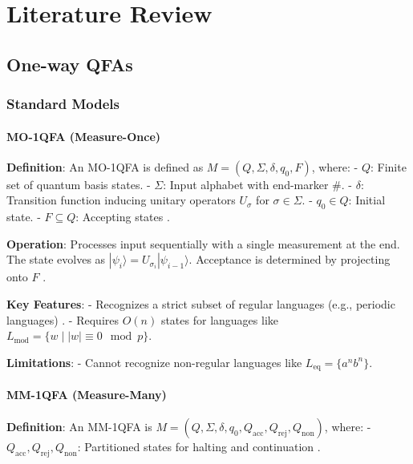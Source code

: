 \chapter{Literature Review}
\label{chap:chapter3}

\section{One-way QFAs}
\label{sec:one-way-qfas}

\subsection{Standard Models}
\label{subsec:standard-models}

\subsubsection{MO-1QFA (Measure-Once)}
\label{sssec:mo-1qfa}

\textbf{Definition}: An MO-1QFA is defined as \( M = (Q, \Sigma, \delta, q_0, F) \), where:
- \( Q \): Finite set of quantum basis states.
- \( \Sigma \): Input alphabet with end-marker \( \# \).
- \( \delta \): Transition function inducing unitary operators \( U_\sigma \) for \( \sigma \in \Sigma \).
- \( q_0 \in Q \): Initial state.
- \( F \subseteq Q \): Accepting states \cite{moore2000quantum}.

\textbf{Operation}: Processes input sequentially with a single measurement at the end. The state evolves as \( |\psi_i\rangle = U_{\sigma_i}|\psi_{i-1}\rangle \). Acceptance is determined by projecting onto \( F \) \cite{moore2000quantum}.

\textbf{Key Features}:
- Recognizes a strict subset of regular languages (e.g., periodic languages) \cite{bertoni2001regular}.
- Requires \( O(n) \) states for languages like \( L_{\text{mod}} = \{w \mid |w| \equiv 0 \mod p\} \).

\textbf{Limitations}: 
- Cannot recognize non-regular languages like \( L_{\text{eq}} = \{a^n b^n\} \).

\subsubsection{MM-1QFA (Measure-Many)}
\label{sssec:mm-1qfa}

\textbf{Definition}: An MM-1QFA is \( M = (Q, \Sigma, \delta, q_0, Q_{\text{acc}}, Q_{\text{rej}}, Q_{\text{non}}) \), where:
- \( Q_{\text{acc}}, Q_{\text{rej}}, Q_{\text{non}} \): Partitioned states for halting and continuation \cite{kondacs1997power}.

